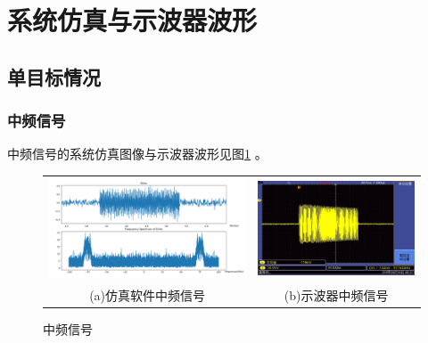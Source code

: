 \documentclass[12pt]{article}
\begin{document}
\section{系统仿真与示波器波形}
\setcounter{table}{0}\setcounter{figure}{0}\setcounter{equation}{0}
\subsection{单目标情况}
\subsubsection{中频信号}
中频信号的系统仿真图像与示波器波形见图\ref{zpxh}
。
\begin{figure}[htbp]
\centering
\begin{tabular}{cc}
\includegraphics[width=.55\textwidth]{TIM20190915233509}&\includegraphics[width=.45\textwidth]{001}\\
(a)仿真软件中频信号&(b)示波器中频信号\\
\end{tabular}
\caption{中频信号}\label{zpxh}
\end{figure}
\end{document}

